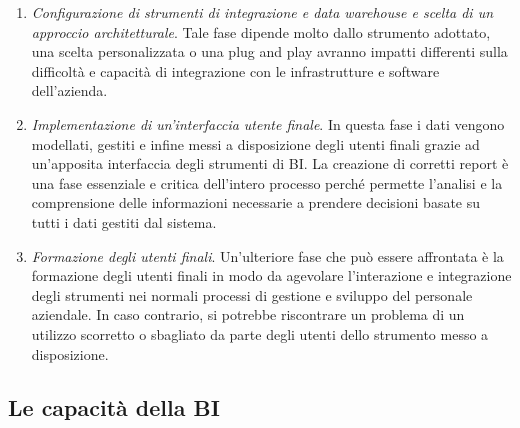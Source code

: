 \begin{enumerate}
    \item \textit{Configurazione di strumenti di integrazione e data warehouse e scelta di un approccio architetturale}. Tale fase dipende molto dallo strumento adottato, una scelta personalizzata o una plug and play avranno impatti differenti sulla difficoltà e capacità di integrazione con le infrastrutture e software dell'azienda.
    \item \textit{Implementazione di un'interfaccia utente finale}. In questa fase i dati vengono modellati, gestiti e infine messi a disposizione degli utenti finali grazie ad un'apposita interfaccia degli strumenti di BI. La creazione di corretti report è una fase essenziale e critica dell'intero processo perché permette l'analisi e la comprensione delle informazioni necessarie a prendere decisioni basate su tutti i dati gestiti dal sistema.
    \item \textit{Formazione degli utenti finali}. Un'ulteriore fase che può essere affrontata è la formazione degli utenti finali in modo da agevolare l'interazione e integrazione degli strumenti nei normali processi di gestione e sviluppo del personale aziendale. In caso contrario, si potrebbe riscontrare un problema di un utilizzo scorretto o sbagliato da parte degli utenti dello strumento messo a disposizione.
\end{enumerate}

\subsection{Le capacità della BI}

